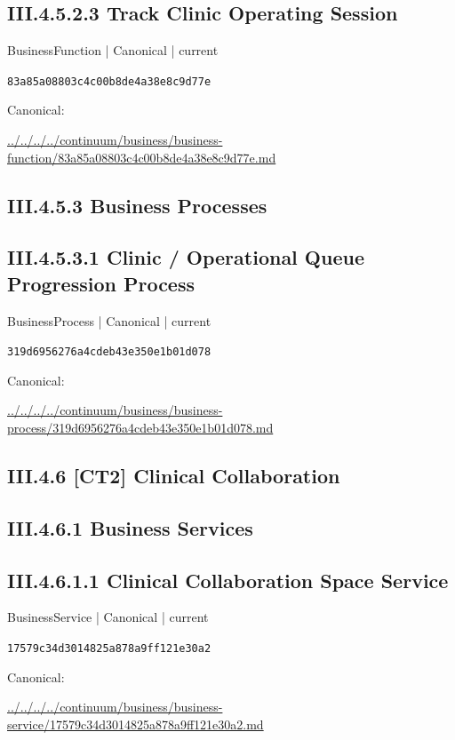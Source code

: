 \documentclass[10pt,a4paper]{article}
\begin{document}
\subsection*{III.4.5.2.3 Track Clinic Operating Session}
{\small BusinessFunction | Canonical | current}\par
\texttt{83a85a08803c4c00b8de4a38e8c9d77e}\par
Canonical: \par
{\footnotesize\url{../../../../continuum/business/business-function/83a85a08803c4c00b8de4a38e8c9d77e.md}}\par
\subsection*{III.4.5.3 Business Processes}
\subsection*{III.4.5.3.1 Clinic / Operational Queue Progression Process}
{\small BusinessProcess | Canonical | current}\par
\texttt{319d6956276a4cdeb43e350e1b01d078}\par
Canonical: \par
{\footnotesize\url{../../../../continuum/business/business-process/319d6956276a4cdeb43e350e1b01d078.md}}\par
\subsection*{III.4.6 [CT2] Clinical Collaboration}
\subsection*{III.4.6.1 Business Services}
\subsection*{III.4.6.1.1 Clinical Collaboration Space Service}
{\small BusinessService | Canonical | current}\par
\texttt{17579c34d3014825a878a9ff121e30a2}\par
Canonical: \par
{\footnotesize\url{../../../../continuum/business/business-service/17579c34d3014825a878a9ff121e30a2.md}}\par
\end{document}
